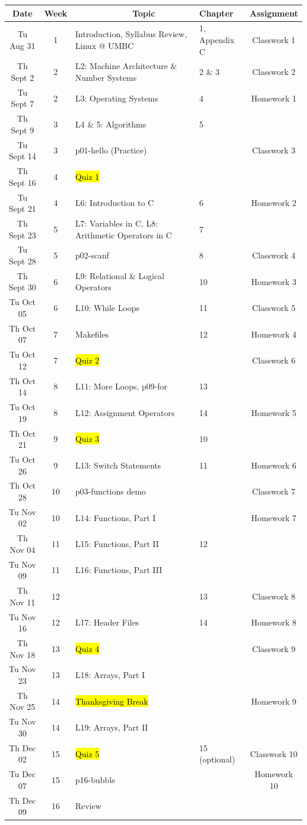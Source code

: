 \documentclass[letter,11pt]{article}
\begin{document}
\small
\begin{tabular}{c c l l c}
Date & Week & ~~~~~~~~~~~~Topic & Chapter & Assignment \\
\hline
Tu Aug 31  & 1 & Introduction, Syllabus Review, Linux @ UMBC & 1, Appendix C & Classwork 1  \\ \hline
Th Sept 2  & 2 & L2: Machine Architecture \& Number Systems & 2 \& 3 & Classwork 2 \\
Tu Sept 7  & 2 & L3: Operating Systems & 4 & Homework 1 \\
Th Sept 9  & 3 & L4 \& 5: Algorithms & 5 & \\
Tu Sept 14 & 3 & p01-hello (Practice) & & Classwork 3  \\
Th Sept 16 & 4 & \hl{Quiz 1} & &  \\
Tu Sept 21 & 4 & L6: Introduction to C & 6 & Homework 2 \\
Th Sept 23 & 5 & L7: Variables in C, L8: Arithmetic Operators in C & 7 \\
Tu Sept 28 & 5 & p02-scanf & 8 & Classwork 4 \\
Th Sept 30 & 6 & L9: Relational \& Logical Operators & 10 & Homework 3 \\ \hline
Tu Oct 05 & 6 & L10: While Loops & 11 & Classwork 5 \\
Th Oct 07 & 7 & Makefiles & 12 & Homework 4 \\
Tu Oct 12 & 7 & \hl{Quiz 2} & & Classwork 6 \\
Th Oct 14 & 8 & L11: More Loops, p09-for & 13 & \\
Tu Oct 19 & 8 & L12: Assignment Operators & 14 & Homework 5 \\
Th Oct 21 & 9 & \hl{Quiz 3} & 10 \\
Tu Oct 26 & 9 & L13: Switch Statements & 11 & Homework 6 \\
Th Oct 28 & 10 & p03-functions demo   & & Classwork 7 \\ \hline
Tu Nov 02 & 10 & L14: Functions, Part I   & & Homework 7\\
Th Nov 04 & 11 & L15: Functions, Part II  & 12 \\
Tu Nov 09 & 11 & L16: Functions, Part III & &  \\
Th Nov 11 & 12 &  & 13 & Classwork 8 \\
Tu Nov 16 & 12 & L17: Header Files & 14 & Homework 8 \\
Th Nov 18 & 13 & \hl{Quiz 4} & & Classwork 9 \\
Tu Nov 23 & 13 & L18: Arrays, Part I & \\
Th Nov 25 & 14 & \hl{Thanksgiving Break} &  & Homework 9\\
Tu Nov 30 & 14 & L19: Arrays, Part II &  \\ \hline
Th Dec 02 & 15 & \hl{Quiz 5} & 15 (optional) & Classwork 10 \\
Tu Dec 07 & 15 & p16-bubble & & Homework 10 \\
Th Dec 09 & 16 & Review &  \\
\end{tabular}
\end{document}
